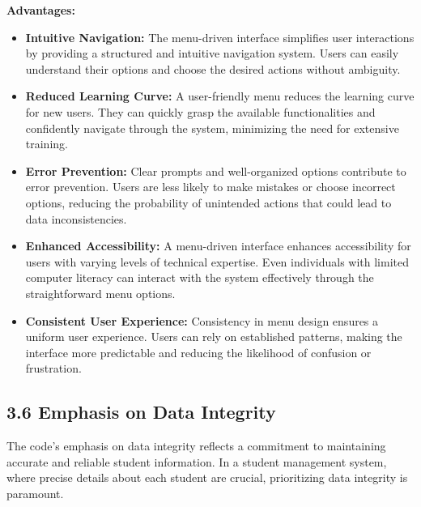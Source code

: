 \documentclass{article}
\begin{document}
\textbf{Advantages:}
\begin{itemize}
    \item \textbf{Intuitive Navigation:} The menu-driven interface simplifies user interactions by providing a structured and intuitive navigation system. 
    Users can easily understand their options and choose the desired actions without ambiguity.
    \item \textbf{Reduced Learning Curve:} A user-friendly menu reduces the learning curve for new users. 
    They can quickly grasp the available functionalities and confidently navigate through the system, minimizing the need for extensive training.
    \item \textbf{Error Prevention:} Clear prompts and well-organized options contribute to error prevention. 
    Users are less likely to make mistakes or choose incorrect options, reducing the probability of unintended actions that could lead to data inconsistencies.
    \item \textbf{Enhanced Accessibility:} A menu-driven interface enhances accessibility for users with varying levels of technical expertise. 
    Even individuals with limited computer literacy can interact with the system effectively through the straightforward menu options.
    \item \textbf{Consistent User Experience:} Consistency in menu design ensures a uniform user experience. 
    Users can rely on established patterns, making the interface more predictable and reducing the likelihood of confusion or frustration.
\end{itemize}

\subsection*{\textbf{3.6 Emphasis on Data Integrity}}

The code's emphasis on data integrity reflects a commitment to maintaining accurate and reliable student information. 
In a student management system, where precise details about each student are crucial, prioritizing data integrity is paramount.
\end{document}
